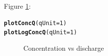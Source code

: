 \documentclass[a4paper,11pt]{article}\usepackage{graphicx, color}
\makeatletter
\newcommand{\hlfunctioncall}[1]{\textcolor[rgb]{0.501960784313725,0,0.329411764705882}{\textbf{#1}}}%
\newenvironment{kframe}{%
 \def\at@end@of@kframe{}%
 \ifinner\ifhmode%
  \def\at@end@of@kframe{\end{minipage}}%
  \begin{minipage}{\columnwidth}%
 \fi\fi%
 \def\FrameCommand##1{\hskip\@totalleftmargin \hskip-\fboxsep
 \colorbox{shadecolor}{##1}\hskip-\fboxsep
     \hskip-\linewidth \hskip-\@totalleftmargin \hskip\columnwidth}%
 \MakeFramed {\advance\hsize-\width
   \@totalleftmargin\z@ \linewidth\hsize
   \@setminipage}}%
 {\par\unskip\endMakeFramed%
 \at@end@of@kframe}
\newenvironment{knitrout}{}{} %
\makeatother
\begin{document}
Figure \ref{fig:plotConcQ}:
\begin{knitrout}
\color{fgcolor}\begin{kframe}
\begin{alltt}
\hlfunctioncall{plotConcQ}(qUnit=1)
\hlfunctioncall{plotLogConcQ}(qUnit=1)
\end{alltt}
\end{kframe}\begin{figure}[]
\caption[Concentration vs discharge]{Concentration vs discharge\label{fig:plotConcQ}}
\end{figure}


\end{knitrout}
\end{document}
